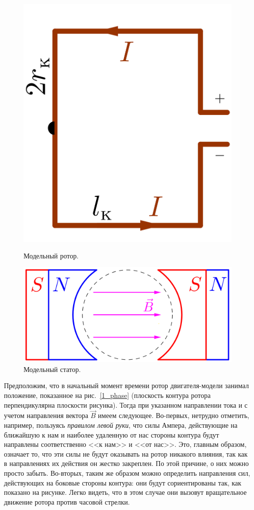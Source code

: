 \documentclass[12pt, a4paper, openany]{extarticle}
\begin{document}
\begin{figure}[h]
	\begin{center}
		\begin{minipage}[h]{0.40\linewidth}
			\centering\includegraphics[height=4 cm]{pics/rotor_in_model.png}
			\caption{Модельный ротор.}
			\label{rotor_in_model} 
		\end{minipage}
		\hfill 
		\begin{minipage}[h]{0.59\linewidth}
			\centering\includegraphics[height=4 cm]{pics/stator_2.png}
			\caption{Модельный статор.}
			\label{stator_in_model}
		\end{minipage}
	\end{center}
\end{figure}

Предположим, что в начальный момент времени ротор двигателя-модели занимал положение, показанное на рис.~\ref{1_phase} (плоскость контура ротора перпендикулярна плоскости рисунка). 
Тогда при указанном направлении тока и с учетом направления вектора $\vec{B}$ имеем следующее.
Во-первых, нетрудно отметить, например, пользуясь \textit{правилом левой руки}, что силы Ампера, действующие на ближайшую к нам и наиболее удаленную от нас стороны контура будут направлены соответственно <<к нам>> и <<от нас>>. 
Это, главным образом, означает то, что эти силы не будут оказывать на ротор никакого влияния, так как в направлениях их действия он жестко закреплен. 
По этой причине, о них можно просто забыть. 
Во-вторых, таким же образом можно определить направления сил, действующих на боковые стороны контура: они будут сориентированы так, как показано на рисунке. 
Легко видеть, что в этом случае они вызовут вращательное движение ротора против часовой стрелки.
\end{document}
